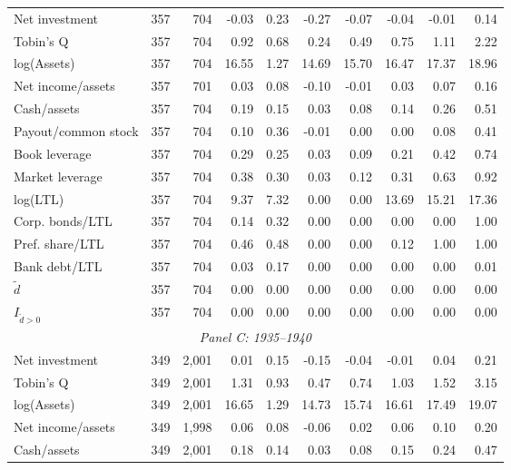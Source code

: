 \begin{table}[p]
\begin{threeparttable}
\begin{tabular}{lrrrrrrrrr}
            \midrule
            Net investment & 357 & 704 & -0.03 & 0.23 & -0.27 & -0.07 & -0.04 & -0.01 & 0.14 \\
            Tobin's Q & 357 & 704 & 0.92 & 0.68 & 0.24 & 0.49 & 0.75 & 1.11 & 2.22 \\
            log(Assets) & 357 & 704 & 16.55 & 1.27 & 14.69 & 15.70 & 16.47 & 17.37 & 18.96 \\
            Net income/assets & 357 & 701 & 0.03 & 0.08 & -0.10 & -0.01 & 0.03 & 0.07 & 0.16 \\
            Cash/assets & 357 & 704 & 0.19 & 0.15 & 0.03 & 0.08 & 0.14 & 0.26 & 0.51 \\
            Payout/common stock & 357 & 704 & 0.10 & 0.36 & -0.01 & 0.00 & 0.00 & 0.08 & 0.41 \\
            Book leverage & 357 & 704 & 0.29 & 0.25 & 0.03 & 0.09 & 0.21 & 0.42 & 0.74 \\
            Market leverage & 357 & 704 & 0.38 & 0.30 & 0.03 & 0.12 & 0.31 & 0.63 & 0.92 \\
            log(LTL) & 357 & 704 & 9.37 & 7.32 & 0.00 & 0.00 & 13.69 & 15.21 & 17.36 \\
            Corp. bonds/LTL & 357 & 704 & 0.14 & 0.32 & 0.00 & 0.00 & 0.00 & 0.00 & 1.00 \\
            Pref. share/LTL & 357 & 704 & 0.46 & 0.48 & 0.00 & 0.00 & 0.12 & 1.00 & 1.00 \\
            Bank debt/LTL & 357 & 704 & 0.03 & 0.17 & 0.00 & 0.00 & 0.00 & 0.00 & 0.01 \\
            \ensuremath{\tilde{d}} & 357 & 704 & 0.00 & 0.00 & 0.00 & 0.00 & 0.00 & 0.00 & 0.00 \\
            \ensuremath{I_{\tilde{d}>0}} & 357 & 704 & 0.00 & 0.00 & 0.00 & 0.00 & 0.00 & 0.00 & 0.00 \\
            \midrule
            \multicolumn{10}{c}{\textit{Panel C: 1935--1940}} \\
            \midrule
            Net investment & 349 & 2,001 & 0.01 & 0.15 & -0.15 & -0.04 & -0.01 & 0.04 & 0.21 \\
            Tobin's Q & 349 & 2,001 & 1.31 & 0.93 & 0.47 & 0.74 & 1.03 & 1.52 & 3.15 \\
            log(Assets) & 349 & 2,001 & 16.65 & 1.29 & 14.73 & 15.74 & 16.61 & 17.49 & 19.07 \\
            Net income/assets & 349 & 1,998 & 0.06 & 0.08 & -0.06 & 0.02 & 0.06 & 0.10 & 0.20 \\
            Cash/assets & 349 & 2,001 & 0.18 & 0.14 & 0.03 & 0.08 & 0.15 & 0.24 & 0.47 \\

\end{tabular}
\end{threeparttable}
\end{table}
